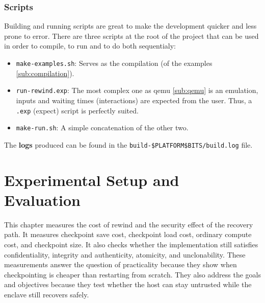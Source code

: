 \documentclass[11pt,a4paper]{report}
\begin{document}
\subsection{Scripts}
Building and running scripts are great to make the development quicker and less prone to error.
There are three scripts at the root of the project that can be used in order to compile, to run and to do both sequentialy:
\begin{itemize}
    \item \verb|make-examples.sh|: Serves as the compilation (of the examples \ref{sub:compilation}).
    \item \verb|run-rewind.exp|: The most complex one as qemu \ref{sub:qemu} is an emulation, inputs and waiting times (interactions) are expected from the user.
    Thus, a \verb|.exp| (expect) script is perfectly suited.
    \item \verb|make-run.sh|: A simple concatenation of the other two.
\end{itemize}
The \textbf{logs} produced can be found in the \verb|build-$PLATFORM$BITS/build.log| file.






\chapter{Experimental Setup and Evaluation}
\label{chap:experimental_setup}
This chapter measures the cost of rewind and the security effect of the recovery path.
It measures checkpoint save cost, checkpoint load cost, ordinary compute cost, and checkpoint size.
It also checks whether the implementation still satisfies confidentiality, integrity and authenticity, atomicity, and unclonability.
These measurements answer the question of practicality because they show when checkpointing is cheaper than restarting from scratch.
They also address the goals and objectives because they test whether the host can stay untrusted while the enclave still recovers safely.
\\
\end{document}
